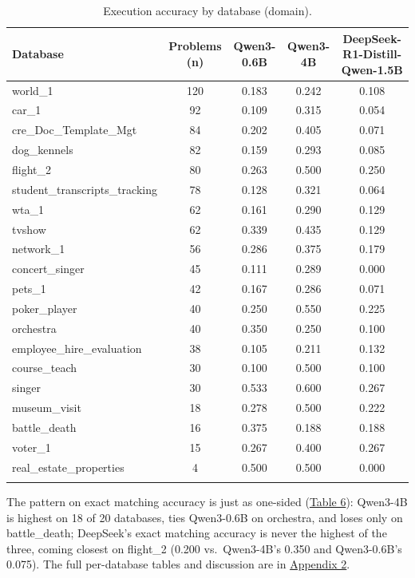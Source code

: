 \begin{table}[H]
\centering
\footnotesize
\caption{Execution accuracy by database (domain).}
\begin{tabular}{lcccc}
\toprule
Database & Problems (n) & Qwen3-0.6B & Qwen3-4B & DeepSeek-R1-Distill-Qwen-1.5B \\
\midrule
world\_1 & 120 & 0.183 & 0.242 & 0.108 \\
car\_1 & 92 & 0.109 & 0.315 & 0.054 \\
cre\_Doc\_Template\_Mgt & 84 & 0.202 & 0.405 & 0.071 \\
dog\_kennels & 82 & 0.159 & 0.293 & 0.085 \\
flight\_2 & 80 & 0.263 & 0.500 & 0.250 \\
student\_transcripts\_tracking & 78 & 0.128 & 0.321 & 0.064 \\
wta\_1 & 62 & 0.161 & 0.290 & 0.129 \\
tvshow & 62 & 0.339 & 0.435 & 0.129 \\
network\_1 & 56 & 0.286 & 0.375 & 0.179 \\
concert\_singer & 45 & 0.111 & 0.289 & 0.000 \\
pets\_1 & 42 & 0.167 & 0.286 & 0.071 \\
poker\_player & 40 & 0.250 & 0.550 & 0.225 \\
orchestra & 40 & 0.350 & 0.250 & 0.100 \\
employee\_hire\_evaluation & 38 & 0.105 & 0.211 & 0.132 \\
course\_teach & 30 & 0.100 & 0.500 & 0.100 \\
singer & 30 & 0.533 & 0.600 & 0.267 \\
museum\_visit & 18 & 0.278 & 0.500 & 0.222 \\
battle\_death & 16 & 0.375 & 0.188 & 0.188 \\
voter\_1 & 15 & 0.267 & 0.400 & 0.267 \\
real\_estate\_properties & 4 & 0.500 & 0.500 & 0.000 \\
\bottomrule
\label{tab:exec-acc-rq1-by-database}
\end{tabular}
\end{table}


The pattern on exact matching accuracy is just as one-sided (\hyperref[tab:exact-acc-rq1-by-database]{Table 6}): Qwen3-4B is highest on 18 of 20 databases, ties Qwen3-0.6B on orchestra, and loses only on battle\_death; DeepSeek's exact matching accuracy is never the highest of the three, coming closest on flight\_2 (0.200 vs.\ Qwen3-4B's 0.350 and Qwen3-0.6B's 0.075). The full per-database tables and discussion are in \hyperref[sec:appendix2]{Appendix 2}.

